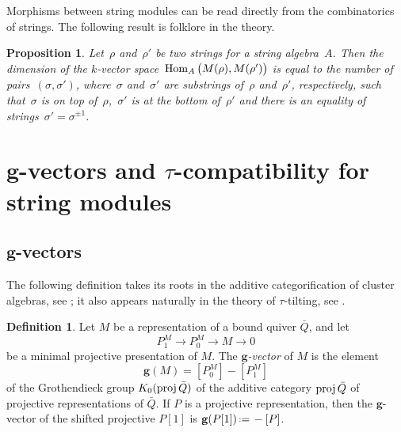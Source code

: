 \documentclass{amsart}
\newtheorem{proposition}[theorem]{Proposition}
\theoremstyle{definition}
\newtheorem{definition}[theorem]{Definition}
\renewcommand{\b}[1]{\mathbf{#1}} %
\newcommand{\eqdef}{\mbox{\,\raisebox{0.2ex}{\scriptsize\ensuremath{\mathrm:}}\ensuremath{=}\,}} %
\newcommand{\darkblue}{\color{darkblue}} %
\newcommand{\defn}[1]{\textsl{\darkblue #1}} %
\newcommand{\Hom}[1]{\operatorname{{\rm Hom}}_{#1}}
\newcommand{\proj}{\operatorname{{\rm proj}}}
\begin{document}
Morphisms between string modules can be read directly from the combinatorics of strings.  The following result is folklore in the theory.

\begin{proposition}
\label{prop:morphismsStringModules}
Let~$\rho$ and~$\rho'$ be two strings for a string algebra~$A$.
Then the dimension of the $k$-vector space~$\Hom{A} \big( M(\rho), M(\rho') \big)$ is equal to the number of pairs~$(\sigma, \sigma')$, where~$\sigma$ and~$\sigma'$ are substrings of~$\rho$ and~$\rho'$, respectively, such that~$\sigma$ is on top of~$\rho$,~$\sigma'$ is at the bottom of~$\rho'$ and there is an equality of strings~$\sigma' = \sigma^{\pm 1}$.

\end{proposition}


\section{$\b{g}$-vectors and $\tau$-compatibility for string modules}
\label{sec:stringModules}

\subsection{$\b{g}$-vectors}
\label{subsec:gvectors}

The following definition takes its roots in the additive categorification of cluster algebras, see \cite{DehyKeller};
it also appears naturally in the theory of $\tau$-tilting, see \cite[Sect.~5.1]{AdachiIyamaReiten}.

\begin{definition}
\label{definition: g-vector of representation}
 Let $M$ be a representation of a bound quiver $\bar Q$, and let
 \[
  P^M_1 \to P^M_0 \to M \to 0
 \]
 be a minimal projective presentation of $M$.  
 The \defn{$\b{g}$-vector} of $M$ is the element 
 \[
  \b{g}(M) = [P_0^M­] - [P_1^M]
 \]
 of the Grothendieck group $K_0(\proj \bar Q)$ of the additive category $\proj \bar Q$ of projective representations of $\bar Q$. 
 If $P$ is a projective representation, then the $\b{g}$-vector of the shifted projective $P[1]$ is $\b{g}(P[1]) \eqdef -[P]$.
\end{definition}
\end{document}
